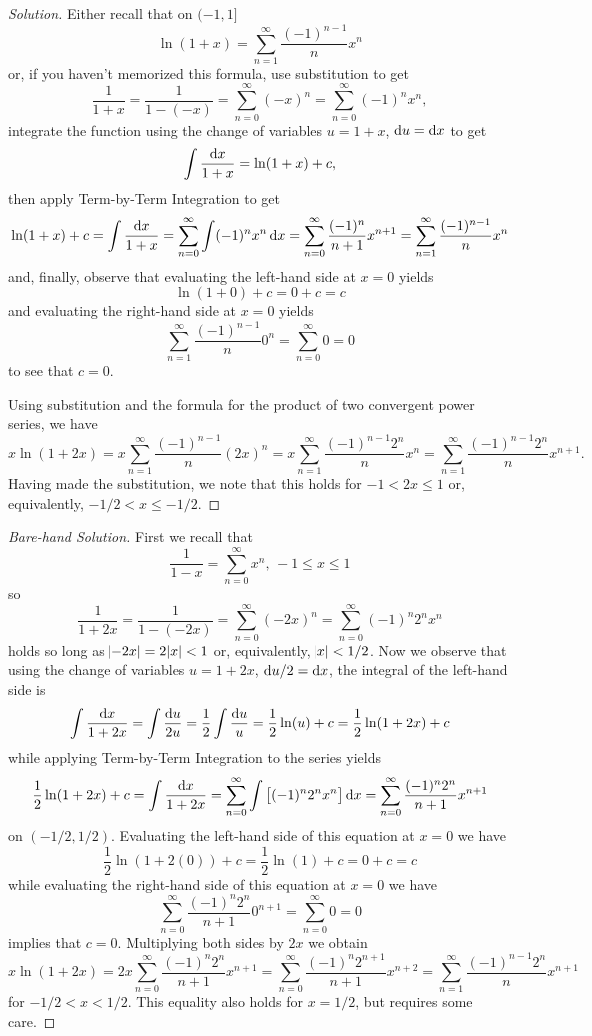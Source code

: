 \documentclass[12pt]{amsart}
\begin{document}
\begin{proof}[Solution]
  Either recall that on \((-1,1]\)
  \[\ln(1 + x) = \sum_{n = 1}^\infty \frac{(-1)^{n-1}}{n} x^n\]
  or, if you haven't memorized this formula, use substitution to get
  \[\frac{1}{1+x} = \frac{1}{1 - (-x)} = \sum_{n = 0}^\infty (-x)^n = \sum_{n = 0}^\infty (-1)^nx^n,\]
  integrate the function using the change of variables \(u = 1 + x\), \(\dif u = \dif x\) to get
  \[\int \frac{\dif x}{1 + x} = \ln(1 + x) + c,\]
  then apply Term-by-Term Integration to get
  \[\ln(1 + x) + c = \int \frac{\dif x}{1 + x} = \sum_{n = 0}^\infty \int (-1)^nx^n\dif x = \sum_{n = 0}^\infty \frac{(-1)^n}{n + 1} x^{n+1} = \sum_{n = 1}^\infty \frac{(-1)^{n-1}}{n} x^n\]
  and, finally, observe that evaluating the left-hand side at \(x = 0\) yields
  \[\ln(1 + 0) + c = 0 + c = c\]
  and evaluating the right-hand side at \(x = 0\) yields
  \[\sum_{n = 1}^\infty \frac{(-1)^{n-1}}{n} 0^n = \sum_{n = 0}^\infty 0 = 0\]
  to see that \(c = 0\).

  Using substitution and the formula for the product of two convergent power series, we have
  \[x\ln(1 + 2x) = x \sum_{n = 1}^\infty \frac{(-1)^{n-1}}{n} (2x)^n
  = x \sum_{n = 1}^\infty \frac{(-1)^{n-1}2^n}{n} x^n
  = \sum_{n = 1}^\infty \frac{(-1)^{n-1}2^n}{n} x^{n+1}.\]
  Having made the substitution, we note that this holds for \(-1 < 2x \leq 1\) or, equivalently, \(-1/2 < x \leq -1/2\).
\end{proof}
\begin{proof}[Bare-hand Solution]
  First we recall that
  \[\frac{1}{1-x} = \sum_{n=0}^\infty x^n,\, -1 \leq x \leq 1\]
  so
  \[\frac{1}{1 + 2x} = \frac{1}{1 - (-2x)} = \sum_{n = 0}^\infty (-2x)^n = \sum_{n = 0}^\infty (-1)^n2^nx^n\]
  holds so long as \(\abs{-2x} = 2\abs{x} < 1\) or, equivalently, \(\abs{x} < 1/2\).
  Now we observe that using the change of variables \(u = 1 + 2x\), \(\dif u/2 = \dif x\), the integral of the left-hand side is
  \[\int \frac{\dif x}{1 + 2x} = \int \frac{\dif u}{2u} = \frac{1}{2} \int \frac{\dif u}{u} = \frac{1}{2}\ln(u) + c = \frac{1}{2}\ln(1 + 2x) + c\]
  while applying Term-by-Term Integration to the series yields
  \[\frac{1}{2}\ln(1 + 2x) + c = \int \frac{\dif x}{1 + 2x}
  = \sum_{n = 0}^\infty \int\left[(-1)^n2^nx^n\right]\dif x
  = \sum_{n = 0}^\infty \frac{(-1)^n2^n}{n+1}x^{n+1}\]
  on \((-1/2,1/2)\).
  Evaluating the left-hand side of this equation at \(x = 0\) we have
  \[\frac{1}{2}\ln(1 + 2(0)) + c = \frac{1}{2}\ln(1) + c = 0 + c = c\]
  while evaluating the right-hand side of this equation at \(x = 0\) we have
  \[\sum_{n = 0}^\infty \frac{(-1)^n2^n}{n+1}0^{n+1} = \sum_{n=0}^\infty 0 = 0\]
  implies that \(c = 0\).
  Multiplying both sides by \(2x\) we obtain
  \[x\ln(1 + 2x) = 2x\sum_{n = 0}^\infty \frac{(-1)^n2^n}{n+1}x^{n+1}
  = \sum_{n = 0}^\infty \frac{(-1)^n2^{n+1}}{n+1}x^{n+2}
  = \sum_{n = 1}^\infty \frac{(-1)^{n-1}2^{n}}{n}x^{n+1}\]
  for \(-1/2 < x < 1/2\).
  This equality also holds for \(x = 1/2\), but requires some care.
\end{proof}
\end{document}
